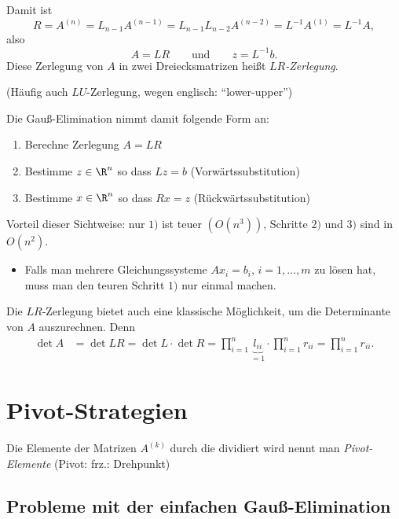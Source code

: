 Damit ist
\begin{equation*}
R = A^{(n)} = L_{n-1}A^{(n-1)} = L_{n-1}L_{n-2}A^{(n-2)} = L^{-1}A^{(1)} = L^{-1}A,
\end{equation*}
also
\begin{equation*}
A= LR
\qquad \text{und} \qquad
z = L^{-1}b.
\end{equation*}
Diese Zerlegung von $A$ in zwei Dreiecksmatrizen heißt \emph{$LR$-Zerlegung}.

\medskip

(Häufig auch $LU$-Zerlegung, wegen englisch: ``lower-upper'')

\bigskip

Die Gauß-Elimination nimmt damit folgende Form an:
\begin{enumerate}[1)]
\item Berechne Zerlegung $A= LR$
\item Bestimme $z \in \R^n$ so dass $Lz =b$ (Vorwärtssubstitution)
\item Bestimme $x \in \R^n$ so dass $Rx = z$ (Rückwärtssubstitution)
\end{enumerate}
Vorteil dieser Sichtweise: nur $1)$ ist teuer $(O(n^3))$, Schritte $2)$ und $3)$ sind in $O(n^2)$.
\begin{itemize}
\item Falls man mehrere Gleichungssysteme $Ax_i = b_i$, $i = 1, \dots, m$ zu lösen hat, muss man den teuren Schritt $1)$ nur einmal machen.
\end{itemize}

\begin{bem}
Die $LR$-Zerlegung bietet auch eine klassische Möglichkeit, um die Determinante von $A$ auszurechnen.
Denn
\begin{align*}
 \det A & = \det LR = \det L \cdot \det R
          = \prod_{i=1}^n \underbrace{l_{ii}}_{=1} \cdot \prod_{i=1}^n r_{ii}
          = \prod_{i=1}^n r_{ii}.
\end{align*}

\end{bem}


\section{Pivot-Strategien}

Die Elemente der Matrizen $A^{(k)}$ durch die dividiert wird nennt man \emph{Pivot-Elemente}
(Pivot: frz.: Drehpunkt)

\subsection{Probleme mit der einfachen Gauß-Elimination}

